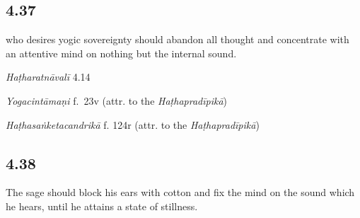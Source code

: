 \begin{ekdosis}
\subsection*{4.37}
\begin{translation} who desires yogic sovereignty should abandon all thought and concentrate with an attentive mind on nothing but the internal sound.
\end{translation}


\begin{testimonia}[hp04_037]
\emph{Haṭharatnāvalī} 4.14
\begin{versinnote}
\end{versinnote}

\emph{Yogacintāmaṇi} f.~23v (attr. to the \emph{Haṭhapradīpikā})
\begin{versinnote}
\tl{\var{°sāmrājyam icchatā ] U, °sāmrājyadhiṣṭhitaḥ N}\\!}
\end{versinnote}

\emph{Haṭhasaṅketacandrikā} f. 124r (attr. to the \emph{Haṭhapradīpikā})
\begin{versinnote}
\end{versinnote}
\end{testimonia}


\subsection*{4.38}
\begin{translation}[hp04_038]
The sage should block his ears with cotton and fix the mind on the sound which he hears, until he attains a state of stillness.
\end{translation}


\end{ekdosis}
